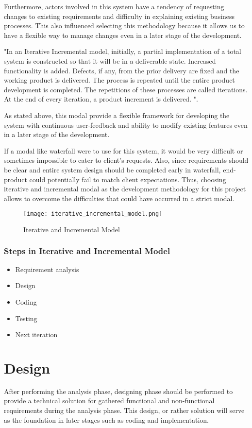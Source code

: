 \documentclass[12pt]{report}
\begin{document}
Furthermore, actors involved in this system have a tendency of requesting changes to existing requirements and difficulty in explaining existing business processes. This also influenced selecting this methodology because it allows us to have a flexible way to manage changes even in a later stage of the development.

"In an Iterative Incremental model, initially, a partial implementation of a total system is constructed so that it will be in a deliverable state. Increased functionality is added. Defects, if any, from the prior delivery are fixed and the working product is delivered. The process is repeated until the entire product development is completed. The repetitions of these processes are called iterations. At the end of every iteration, a product increment is delivered. \cite{point_2019_sdlc}".

As stated above, this modal provide a flexible framework for developing the system with continuous user-feedback and ability to modify existing features even in a later stage of the development.

If a modal like waterfall were to use for this system, it would be very difficult or sometimes impossible to cater to client's requests. Also, since requirements should be clear and entire system design should be completed early in waterfall, end-product could potentially fail to match client expectations. Thus, choosing iterative and incremental modal as the development methodology for this project allows to overcome the difficulties that could have occurred in a strict modal.

\begin{figure}[H]
	\centering
	\texttt{[image: iterative\_incremental\_model.png]}
	\caption{Iterative and Incremental Model}
\end{figure}

\subsection{Steps in Iterative and Incremental Model}
\begin{itemize}
	\item Requirement analysis
	\item Design
	\item Coding
	\item Testing
	\item Next iteration
\end{itemize}

\newpage
\chapter{Design}
After performing the analysis phase, designing phase should be performed to provide a technical solution for gathered functional and non-functional requirements during the analysis phase. This design, or rather solution will serve as the foundation in later stages such as coding and implementation.
\end{document}
